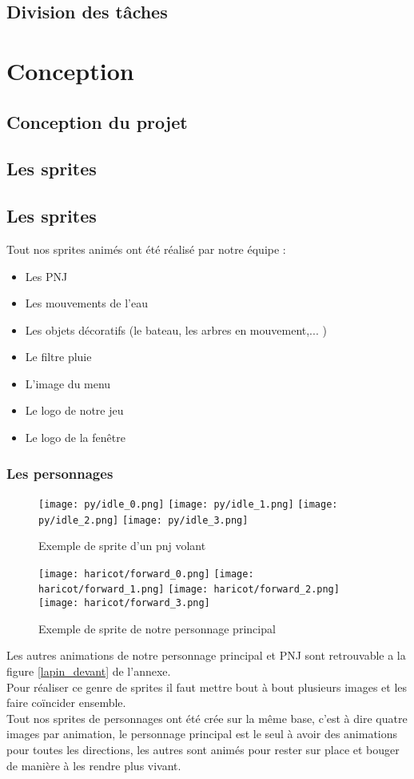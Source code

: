 \documentclass{article}
\begin{document}
\subsection{Division des tâches}
\section{Conception}
\subsection{Conception du projet}
\subsection{Les sprites}
\subsection{Les sprites}
Tout nos sprites animés ont été réalisé par notre équipe : 
\begin{itemize}
    \item Les PNJ
    \item Les mouvements de l'eau
    \item Les objets décoratifs (le bateau, les arbres en mouvement,... )
    \item Le filtre pluie
    \item L'image du menu
    \item Le logo de notre jeu
    \item Le logo de la fenêtre
\end{itemize}
\subsubsection{Les personnages}
\begin{figure}[h]
    \centering
    \texttt{[image: py/idle\_0.png]}
    \texttt{[image: py/idle\_1.png]}
    \texttt{[image: py/idle\_2.png]}
    \texttt{[image: py/idle\_3.png]}
    \caption{Exemple de sprite d'un pnj volant}
\end{figure}

\begin{figure}[h]
    \centering
    \texttt{[image: haricot/forward\_0.png]}
    \texttt{[image: haricot/forward\_1.png]}
    \texttt{[image: haricot/forward\_2.png]}
    \texttt{[image: haricot/forward\_3.png]}
    \caption{Exemple de sprite de notre personnage principal}
\end{figure}
Les autres animations de notre personnage principal et PNJ sont retrouvable a la figure \ref{lapin_devant} de l'annexe.
\\
Pour réaliser ce genre de sprites il faut mettre bout à bout plusieurs images et les faire coïncider ensemble.\\
Tout nos sprites de personnages ont été crée sur la même base, c'est à dire quatre images par animation, le personnage principal est le seul à avoir des animations pour toutes les directions, les autres sont animés pour rester sur place et bouger de manière à les rendre plus vivant.
\\
\end{document}
